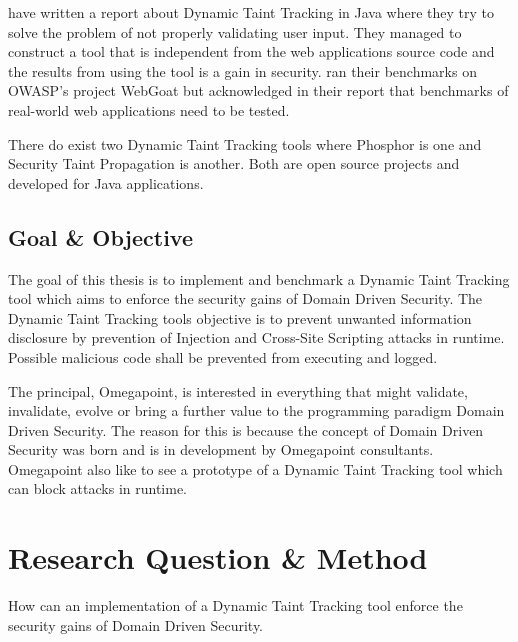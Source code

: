 \documentclass{../kththesis}
\begin{document}
	\textcite{Haldar} have written a report about Dynamic Taint Tracking in Java where they try to solve the problem of not properly validating user input. They managed to construct a tool that is independent from the web applications source code and the results from using the tool is a gain in security. \textcite{Haldar} ran their benchmarks on OWASP’s project WebGoat \parencite{webgoat} but acknowledged in their report that benchmarks of real-world web applications need to be tested.
	
	There do exist two Dynamic Taint Tracking tools where Phosphor \parencite{phosphor} is one and Security Taint Propagation \parencite{securityTaint} is another. Both are open source projects and developed for Java applications.
	
	
	\section{Goal \& Objective}
	The goal of this thesis is to implement and benchmark a Dynamic Taint Tracking tool which aims to enforce the security gains of Domain Driven Security. The Dynamic Taint Tracking tools objective is to prevent unwanted information disclosure by prevention of Injection and Cross-Site Scripting attacks in runtime. Possible malicious code shall be prevented from executing and logged.
	
	The principal, Omegapoint, is interested in everything that might validate, invalidate, evolve or bring a further value to the programming paradigm Domain Driven Security. The reason for this is because the concept of Domain Driven Security was born and is in development by Omegapoint consultants. Omegapoint also like to see a prototype of a Dynamic Taint Tracking tool which can block attacks in runtime.
	
	
	
	\chapter{Research Question \& Method} \label{ResearchQuestionMethod}
	\begin{chapquote}{}
		How can an implementation of a Dynamic Taint Tracking tool enforce the security gains of Domain Driven Security.
	\end{chapquote}
	
\end{document}
